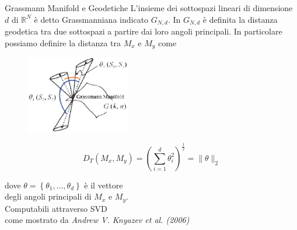 \documentclass[usenames,dvipsnames,9pt]{beamer}
\newcommand{\RR}{\mathbb{R}}
\theoremstyle{definition}
\begin{document}
\begin{frame}{Grassmann Manifold e Geodetiche}
L'insieme dei sottospazi lineari di dimensione $d$ di $\RR^{N}$ è detto Grassmanniana indicato $G_{N,d}$. In $G_{N,d}$ è definita la distanza geodetica tra due sottospazi a partire dai loro angoli principali. In particolare possiamo definire la distanza tra $M_x$ e $M_y$ come

\begin{figure}
    \centering
    \includegraphics[width=0.4\textwidth]{graphics/principalangles.eps}
\end{figure}

\begin{equation*}
	D_{T}\left(M_{x}, M_{y}\right)=\left(\sum_{i=1}^{d} \theta_{i}^{2}\right)^{\frac{1}{2}}=\|\theta\|_{2}
\end{equation*}

dove $\theta=\left\{\theta_{1}, \ldots, \theta_{d}\right\}$ è il vettore \\ degli angoli principali di $M_x$ e $M_y$. \\
Computabili attraverso SVD \\
come mostrato da
\textit{Andrew V. Knyazev et al. (2006)}
\end{frame}
\end{document}
